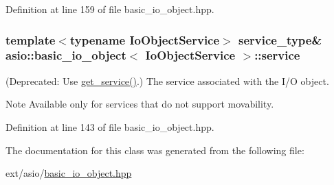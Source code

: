 Definition at line 159 of file basic\+\_\+io\+\_\+object.\+hpp.

\hypertarget{classasio_1_1basic__io__object_a97608b43b051fbbb1254cda9ab2b5a56}{}
\subsubsection[{service}]{\setlength{\rightskip}{0pt plus 5cm}template$<$typename Io\+Object\+Service$>$ {\bf service\+\_\+type}\& {\bf asio\+::basic\+\_\+io\+\_\+object}$<$ Io\+Object\+Service $>$\+::service\hspace{0.3cm}{\ttfamily [protected]}}\label{classasio_1_1basic__io__object_a97608b43b051fbbb1254cda9ab2b5a56}
(Deprecated\+: Use \hyperlink{classasio_1_1basic__io__object_a853f5f5ae3c6d87bbef49b18006f0b24}{get\+\_\+service()}.) The service associated with the I/\+O object. \begin{DoxyNote}{Note}
Available only for services that do not support movability. 
\end{DoxyNote}


Definition at line 143 of file basic\+\_\+io\+\_\+object.\+hpp.



The documentation for this class was generated from the following file\+:\begin{DoxyCompactItemize}
\item 
ext/asio/\hyperlink{basic__io__object_8hpp}{basic\+\_\+io\+\_\+object.\+hpp}\end{DoxyCompactItemize}
